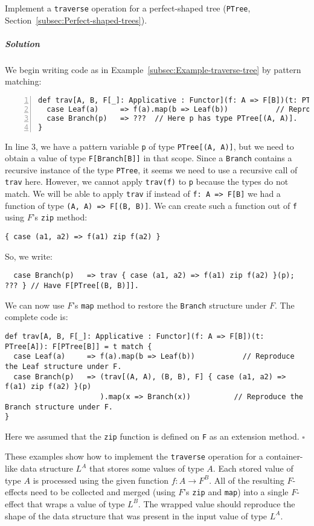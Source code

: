Implement a \lstinline!traverse! operation for a perfect-shaped tree
(\lstinline!PTree!, Section~\ref{subsec:Perfect-shaped-trees}).

\subparagraph{Solution}

We begin writing code as in Example~\ref{subsec:Example-traverse-tree}
by pattern matching:
\begin{lstlisting}[numbers=left]
def trav[A, B, F[_]: Applicative : Functor](f: A => F[B])(t: PTree[A]): F[PTree[B]] = t match {
  case Leaf(a)     => f(a).map(b => Leaf(b))           // Reproduce the Leaf structure under F.
  case Branch(p)   => ???  // Here p has type PTree[(A, A)].
}
\end{lstlisting}
In line 3, we have a pattern variable \lstinline!p! of type \lstinline!PTree[(A, A)]!,
but we need to obtain a value of type \lstinline!F[Branch[B]]! in
that scope. Since a \lstinline!Branch! contains a recursive instance
of the type \lstinline!PTree!, it seems we need to use a recursive
call of \lstinline!trav! here. However, we cannot apply \lstinline!trav(f)!
to \lstinline!p! because the types do not match. We will be able
to apply \lstinline!trav! if instead of \lstinline!f: A => F[B]!
we had a function of type \lstinline!(A, A) => F[(B, B)]!. We can
create such a function out of \lstinline!f! using $F$\textsf{'}s \lstinline!zip!
method:
\begin{lstlisting}
{ case (a1, a2) => f(a1) zip f(a2) }
\end{lstlisting}
 So, we write:
\begin{lstlisting}
  case Branch(p)   => trav { case (a1, a2) => f(a1) zip f(a2) }(p); ??? } // Have F[PTree[(B, B)]].
\end{lstlisting}
We can now use $F$\textsf{'}s \lstinline!map! method to restore the \lstinline!Branch!
structure under $F$. The complete code is:
\begin{lstlisting}
def trav[A, B, F[_]: Applicative : Functor](f: A => F[B])(t: PTree[A]): F[PTree[B]] = t match {
  case Leaf(a)     => f(a).map(b => Leaf(b))           // Reproduce the Leaf structure under F.
  case Branch(p)   => (trav[(A, A), (B, B), F] { case (a1, a2) => f(a1) zip f(a2) }(p)
                      ).map(x => Branch(x))          // Reproduce the Branch structure under F.
}
\end{lstlisting}
Here we assumed that the \lstinline!zip! function is defined on \lstinline!F!
as an extension method. $\square$

These examples show how to implement the \lstinline!traverse! operation
for a container-like data structure $L^{A}$ that stores some values
of type $A$. Each stored value of type $A$ is processed using the
given function $f:A\rightarrow F^{B}$. All of the resulting $F$-effects
need to be collected and merged (using $F$\textsf{'}s \lstinline!zip! and
\lstinline!map!) into a single $F$-effect that wraps a value of
type $L^{B}$. The wrapped value should reproduce the shape of the
data structure that was present in the input value of type $L^{A}$. 

